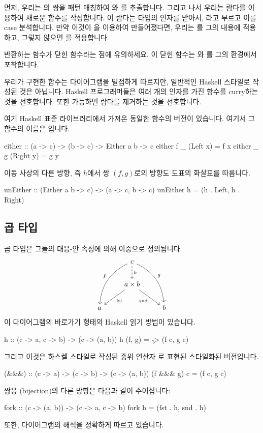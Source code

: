 \documentclass[DaoFP]{subfiles}
\begin{document}
먼저, 우리는 의 쌍을 패턴 매칭하여 와 를 추출합니다. 그리고 나서 우리는 람다를 이용하여 새로운 함수를 작성합니다. 이 람다는  타입의 인자를 받아서, 라고 부르고 이를 case 분석합니다. 만약 이것이 을 이용하여 만들어졌다면, 우리는 를 그의 내용에 적용하고, 그렇지 않으면 를 적용합니다.

반환하는 함수가 닫힌 함수라는 점에 유의하세요. 이 닫힌 함수는 와 를 그의 환경에서 포착합니다.

우리가 구현한 함수는 다이어그램을 밀접하게 따르지만, 일반적인 Haskell 스타일로 작성된 것은 아닙니다. Haskell 프로그래머들은 여러 개의 인자를 가진 함수를 curry하는 것을 선호합니다. 또한 가능하면 람다를 제거하는 것을 선호합니다.

여기 Haskell 표준 라이브러리에서 가져온 동일한 함수의 버전이 있습니다. 여기서 그 함수의 이름은  입니다.
\begin{haskell}
either :: (a -> c) -> (b -> c) -> Either a b -> c
either f _ (Left x)     =  f x
either _ g (Right y)    =  g y
\end{haskell}

이동 사상의 다른 방향, 즉 $h$에서 쌍 $(f, g)$로의 방향도 도표의 화살표를 따릅니다.
\begin{haskell}
unEither :: (Either a b -> c) -> (a -> c, b -> c)
unEither h = (h . Left, h . Right)
\end{haskell}


\subsection{곱 타입}

곱 타입은 그들의 대응-안 속성에 의해 이중으로 정의됩니다.
\[
 \begin{tikzcd}
 & c
\arrow[d, dashed, "h"]
 \arrow[ddl, bend right, "f"']
 \arrow[ddr, bend left, "g"]
\\
&a \times b
 \arrow[dl,  "\text{fst}"]
  \arrow[dr,   "\text{snd}"']
\\
a && b
 \end{tikzcd}
\]
이 다이어그램의 바로가기 형태의 Haskell 읽기 방법이 있습니다.
\begin{haskell}
h :: (c -> a, c -> b) -> (c -> (a, b))
h (f, g) = \c -> (f c, g c)
\end{haskell}
그리고 이것은 하스켈 스타일로 작성된 중위 연산자 \hask{&&&}로 표현된 스타일화된 버전입니다.
\begin{haskell}
(&&&) :: (c -> a) -> (c -> b) -> (c -> (a, b))
(f &&& g) c = (f c, g c)
\end{haskell}
쌍응 (bijection)의 다른 방향은 다음과 같이 주어집니다:
\begin{haskell}
fork :: (c -> (a, b)) -> (c -> a, c -> b)
fork h = (fst . h, snd . h)
\end{haskell}
또한, 다이어그램의 해석을 정확하게 따르고 있습니다.
\end{document}
